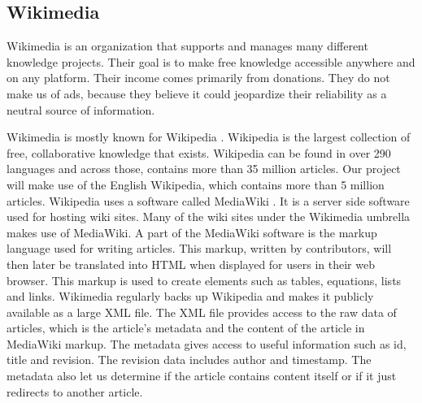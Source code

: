 \subsection{Wikimedia} \label{wikimedia}
Wikimedia \cite{wikimedia} is an organization that supports and manages many different knowledge projects. Their goal is to make free knowledge accessible anywhere and on any platform. Their income comes primarily from donations. They do not make us of ads, because they believe it could jeopardize their reliability as a neutral source of information.

Wikimedia is mostly known for Wikipedia \cite{wikipedia}. Wikipedia is the largest collection of free, collaborative knowledge that exists. Wikipedia can be found in over 290 languages and across those, contains more than 35 million articles. Our project will make use of the English Wikipedia, which contains more than 5 million articles. Wikipedia uses a  software called MediaWiki \cite{mediawiki}. It is a server side software used for hosting wiki sites. Many of the wiki sites under the Wikimedia umbrella makes use of MediaWiki. A part of the MediaWiki software is the markup language used for writing articles. This markup, written by contributors, will then later be translated into HTML when displayed for users in their web browser. This markup is used to create elements such as tables, equations, lists and links. Wikimedia regularly backs up Wikipedia and makes it publicly available as a large XML file. The XML file provides access to the raw data of articles, which is the article's metadata and the content of the article in MediaWiki markup. The metadata gives access to useful information such as id, title and revision. The revision data includes author and timestamp. The metadata also let us determine if the article contains content itself or if it just redirects to another article.

